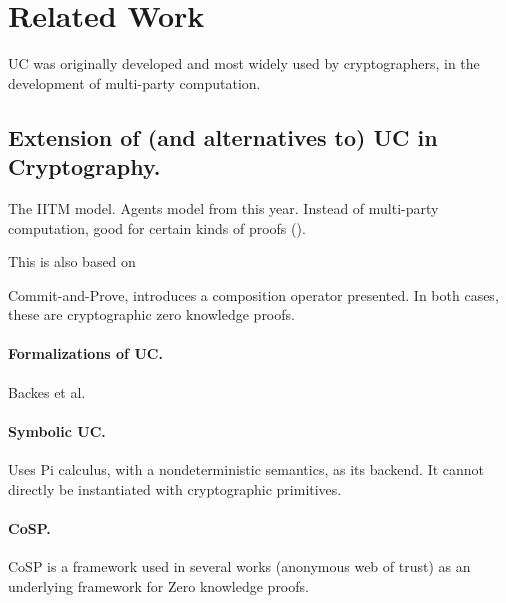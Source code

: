 \section{Related Work}


UC was originally developed and most widely used by cryptographers, in the development of multi-party computation.

\subsection{Extension of (and alternatives to) UC in Cryptography.}

The IITM model.
Agents model from this year. Instead of multi-party computation, good for certain kinds of proofs ().

This is also based on 

Commit-and-Prove, introduces a composition operator presented. In both cases, these are cryptographic zero knowledge proofs.

\paragraph{Formalizations of UC.}

Backes et al.

\paragraph{Symbolic UC.} Uses Pi calculus, with a nondeterministic semantics, as its backend. It cannot directly be instantiated with cryptographic primitives.

\paragraph{CoSP.} CoSP is a framework used in several works (anonymous web of trust) as an underlying framework for Zero knowledge proofs.
